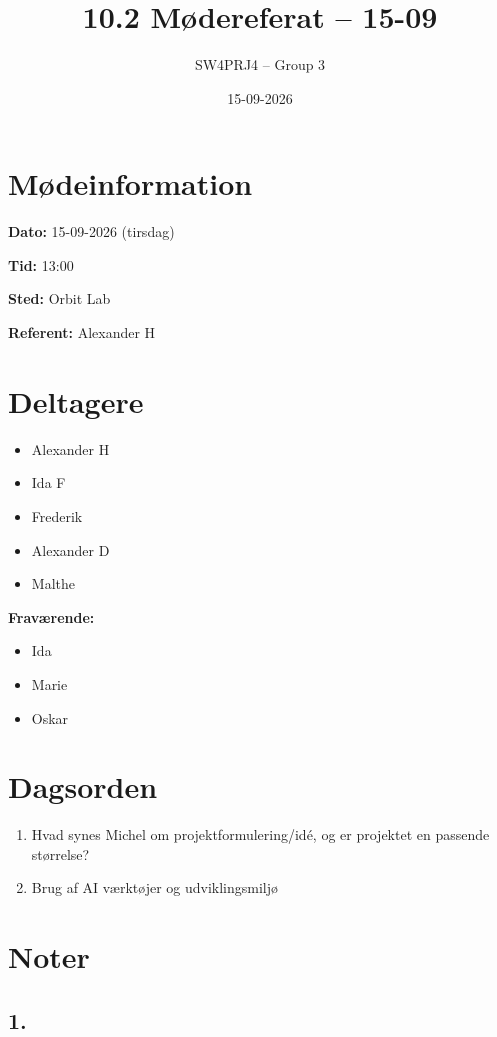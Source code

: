 \documentclass[a4paper,11pt]{article}
\title{10.2 Mødereferat -- 15-09}
\author{SW4PRJ4 -- Group 3}
\date{15-09-2026}
\begin{document}
\maketitle

\section*{Mødeinformation}

\textbf{Dato:} 15-09-2026 (tirsdag)

\textbf{Tid:} 13:00

\textbf{Sted:} Orbit Lab

\textbf{Referent:} Alexander H

\section*{Deltagere}

\begin{itemize}
    \item Alexander H
    \item Ida F
    \item Frederik
    \item Alexander D
    \item Malthe
\end{itemize}

\textbf{Fraværende:}

\begin{itemize}
    \item Ida
    \item Marie
    \item Oskar
\end{itemize}

\section*{Dagsorden}

\begin{enumerate}
    \item Hvad synes Michel om projektformulering/idé, og er projektet en passende størrelse?
    \item Brug af AI værktøjer og udviklingsmiljø
\end{enumerate}

\section*{Noter}
\subsection*{1.}
\end{document}

